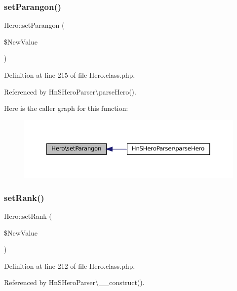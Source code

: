 \subsubsection{\texorpdfstring{set\+Parangon()}{setParangon()}}
{\footnotesize\ttfamily Hero\+::set\+Parangon (\begin{DoxyParamCaption}\item[{}]{\$\+New\+Value }\end{DoxyParamCaption})}



Definition at line 215 of file Hero.\+class.\+php.



Referenced by Hn\+S\+Hero\+Parser\textbackslash{}parse\+Hero().

Here is the caller graph for this function\+:\nopagebreak
\begin{figure}[H]
\begin{center}
\leavevmode
\includegraphics[width=350pt]{class_hero_a610db717ebe7ad94233b86a637fca660_icgraph}
\end{center}
\end{figure}
\mbox{\label{class_hero_a28f6b0ed48c9046e2ed5929784884ac6}} 
\subsubsection{\texorpdfstring{set\+Rank()}{setRank()}}
{\footnotesize\ttfamily Hero\+::set\+Rank (\begin{DoxyParamCaption}\item[{}]{\$\+New\+Value }\end{DoxyParamCaption})}



Definition at line 212 of file Hero.\+class.\+php.



Referenced by Hn\+S\+Hero\+Parser\textbackslash{}\+\_\+\+\_\+construct().

